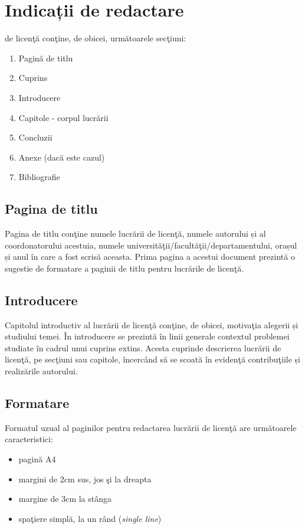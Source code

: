 \chapter{Indicații de redactare}
\label{chap:intro}

 de licenţă conţine, de obicei, următoarele secţiuni:

\begin{enumerate}[label=\alph*.]
	\item Pagină de titlu
	\item Cuprins
	\item Introducere
	\item Capitole - corpul lucrării
	\item Concluzii
	\item Anexe (dacă este cazul)
	\item Bibliografie  
\end{enumerate}


\section{Pagina de titlu}

Pagina de titlu conţine numele lucrării de licenţă, numele autorului și al coordonatorului acestuia, numele universităţii/facultăţii/departamentului, orașul și anul în care a fost scrisă aceasta. Prima pagina a acestui document prezintă o sugestie de formatare a paginii de titlu pentru lucrările de licenţă.


\section{Introducere}

	Capitolul introductiv al lucrării de licenţă conţine, de obicei, motivaţia alegerii și studiului temei. În introducere se prezintă în linii generale contextul problemei studiate în cadrul unui cuprins extins. Acesta cuprinde descrierea lucrării de licenţă, pe secţiuni sau capitole, încercând să se scoată în evidenţă contribuţiile și realizările autorului.


\section{Formatare}

Formatul uzual al paginilor pentru redactarea lucrării de licenţă are următoarele caracteristici:

\begin{itemize}
\item pagină A4
\item 	margini de 2cm sus, jos \c si la dreapta
\item  margine de 3cm la stânga
\item spaţiere simplă, la un rând (\emph{single line})
\end{itemize}

